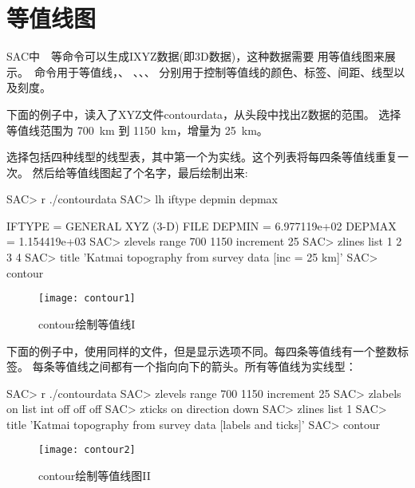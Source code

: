 \section{等值线图}
\label{sec:contour}
SAC中~~等命令可以生成IXYZ数据(即3D数据)，这种数据需要
用等值线图来展示。~命令用于等值线，、
、、、
分别用于控制等值线的颜色、标签、间距、线型以及刻度。

下面的例子中，读入了XYZ文件contourdata，从头段中找出Z数据的范围。
选择等值线范围为 \SI{700}{\km} 到 \SI{1150}{\km}，增量为 \SI{25}{\km}。

选择包括四种线型的线型表，其中第一个为实线。这个列表将每四条等值线重复一次。
然后给等值线图起了个名字，最后绘制出来:
\begin{SACCode}
SAC> r ./contourdata
SAC> lh iftype depmin depmax

       IFTYPE = GENERAL XYZ (3-D) FILE
       DEPMIN = 6.977119e+02
       DEPMAX = 1.154419e+03
SAC> zlevels range 700 1150 increment 25
SAC> zlines list 1 2 3 4
SAC> title 'Katmai topography from survey data [inc = 25 km]'
SAC> contour
\end{SACCode}

\begin{figure}[H]
\centering
\texttt{[image: contour1]}
\caption{contour绘制等值线I}
\end{figure}

下面的例子中，使用同样的文件，但是显示选项不同。每四条等值线有一个整数标签。
每条等值线之间都有一个指向向下的箭头。所有等值线为实线型：
\begin{SACCode}
SAC> r ./contourdata
SAC> zlevels range 700 1150 increment 25
SAC> zlabels on list int off off off
SAC> zticks on direction down
SAC> zlines list 1
SAC> title 'Katmai topography from survey data [labels and ticks]'
SAC> contour
\end{SACCode}

\begin{figure}[H]
\centering
\texttt{[image: contour2]}
\caption{contour绘制等值线图II}
\end{figure}
